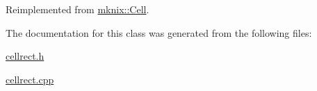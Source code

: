 Reimplemented from \hyperlink{classmknix_1_1_cell_a77d7851793538f99d8aa0ea664fa0fb7}{mknix\-::\-Cell}.



The documentation for this class was generated from the following files\-:\begin{DoxyCompactItemize}
\item 
\hyperlink{cellrect_8h}{cellrect.\-h}\item 
\hyperlink{cellrect_8cpp}{cellrect.\-cpp}\end{DoxyCompactItemize}
